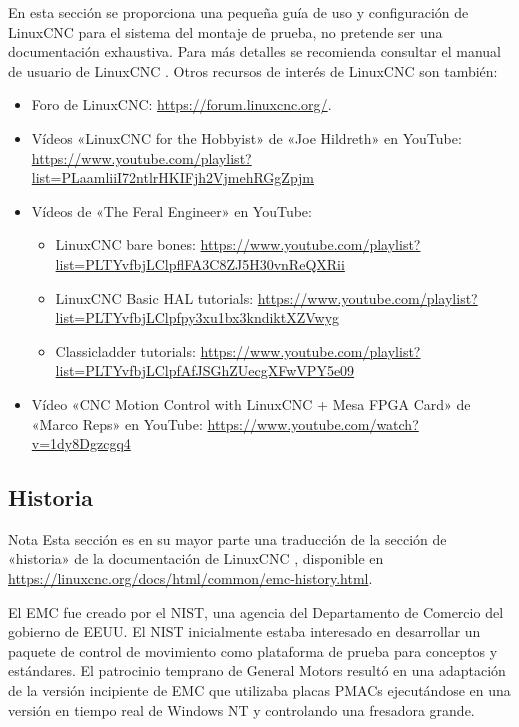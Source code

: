\documentclass[english,spanish,a4paper,11pt]{article}
\begin{document}
En esta sección se proporciona una pequeña guía de uso y configuración de LinuxCNC para el sistema del montaje de prueba, no pretende ser una documentación exhaustiva. Para más detalles se recomienda consultar el manual de usuario de LinuxCNC \cite{linuxcncdoc}. Otros recursos de interés de LinuxCNC son también:
\begin{itemize}
    \item Foro de LinuxCNC: \url{https://forum.linuxcnc.org/}.
    
    \item Vídeos «LinuxCNC for the Hobbyist» de «Joe Hildreth» en YouTube: \url{https://www.youtube.com/playlist?list=PLaamliiI72ntlrHKIFjh2VjmehRGgZpjm}

    \item Vídeos de «The Feral Engineer» en YouTube:
    \begin{itemize}
        \item LinuxCNC bare bones: \url{https://www.youtube.com/playlist?list=PLTYvfbjLClpflFA3C8ZJ5H30vnReQXRii}

        \item LinuxCNC Basic HAL tutorials: \url{https://www.youtube.com/playlist?list=PLTYvfbjLClpfpy3xu1bx3kndiktXZVwyg}

        \item Classicladder tutorials: \url{https://www.youtube.com/playlist?list=PLTYvfbjLClpfAfJSGhZUecgXFwVPY5e09}
    \end{itemize}

    \item Vídeo «CNC Motion Control with LinuxCNC + Mesa FPGA Card» de «Marco Reps» en YouTube: \url{https://www.youtube.com/watch?v=1dy8Dgzcgq4}
\end{itemize}


\subsection{Historia}

\begin{admonition}{Nota}
    Esta sección es en su mayor parte una traducción de la sección de «historia» de la documentación de LinuxCNC \cite{linuxcncdoc}, disponible en \url{https://linuxcnc.org/docs/html/common/emc-history.html}.
\end{admonition}


El \ac{EMC} fue creado por el \ac{NIST}, una agencia del Departamento de Comercio del gobierno de \ac{EEUU}. El \ac{NIST} inicialmente estaba interesado en desarrollar un paquete de control de movimiento como plataforma de prueba para conceptos y estándares. El patrocinio temprano de General Motors resultó en una adaptación de la versión incipiente de \ac{EMC} que utilizaba placas \acp{PMAC} ejecutándose en una versión en tiempo real de Windows NT y controlando una fresadora grande.
\end{document}
